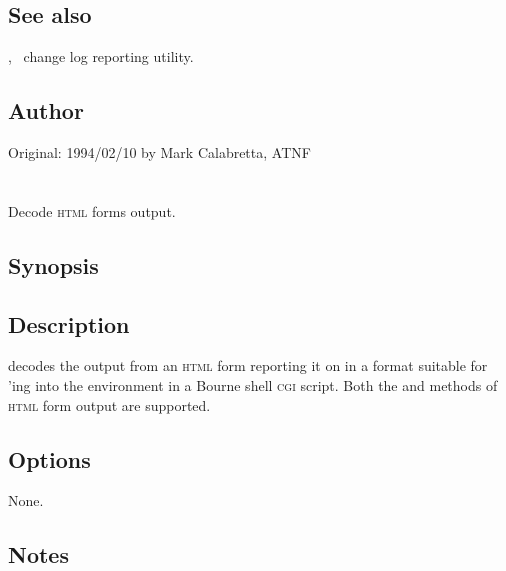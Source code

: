 \subsection*{See also}
 
, \aipspp\ change log reporting utility.
 
\subsection*{Author}
 
Original: 1994/02/10 by Mark Calabretta, ATNF


\newpage
\section{}
\label{parseform}



Decode \textsc{html} forms output.

\subsection*{Synopsis}
 
\begin{synopsis}
\end{synopsis}
 
\subsection*{Description}
 
 decodes the output from an \textsc{html} form reporting it on
 in a format suitable for 'ing into the environment
in a Bourne shell \textsc{cgi} script.  Both the  and 
methods of \textsc{html} form output are supported.
 
\subsection*{Options}
 
None.
 
\subsection*{Notes}
 
